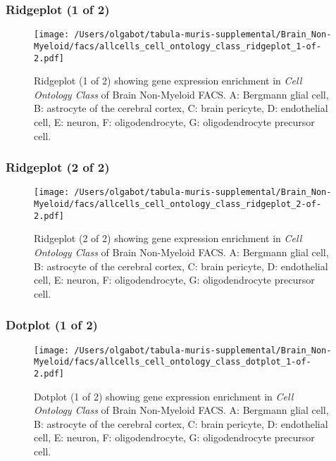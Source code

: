 \clearpage
\subsubsection{Ridgeplot (1 of 2)}
\begin{figure}[h]
\centering
\texttt{[image: /Users/olgabot/tabula-muris-supplemental/Brain\_Non-Myeloid/facs/allcells\_cell\_ontology\_class\_ridgeplot\_1-of-2.pdf]}

\caption{ Ridgeplot (1 of 2)  showing gene expression enrichment in \emph{Cell Ontology Class} of Brain Non-Myeloid FACS. A: Bergmann glial cell, B: astrocyte of the cerebral cortex, C: brain pericyte, D: endothelial cell, E: neuron, F: oligodendrocyte, G: oligodendrocyte precursor cell.}
\end{figure}


\clearpage
\subsubsection{Ridgeplot (2 of 2)}
\begin{figure}[h]
\centering
\texttt{[image: /Users/olgabot/tabula-muris-supplemental/Brain\_Non-Myeloid/facs/allcells\_cell\_ontology\_class\_ridgeplot\_2-of-2.pdf]}

\caption{ Ridgeplot (2 of 2)  showing gene expression enrichment in \emph{Cell Ontology Class} of Brain Non-Myeloid FACS. A: Bergmann glial cell, B: astrocyte of the cerebral cortex, C: brain pericyte, D: endothelial cell, E: neuron, F: oligodendrocyte, G: oligodendrocyte precursor cell.}
\end{figure}


\clearpage
\subsubsection{Dotplot (1 of 2)}
\begin{figure}[h]
\centering
\texttt{[image: /Users/olgabot/tabula-muris-supplemental/Brain\_Non-Myeloid/facs/allcells\_cell\_ontology\_class\_dotplot\_1-of-2.pdf]}

\caption{ Dotplot (1 of 2)  showing gene expression enrichment in \emph{Cell Ontology Class} of Brain Non-Myeloid FACS. A: Bergmann glial cell, B: astrocyte of the cerebral cortex, C: brain pericyte, D: endothelial cell, E: neuron, F: oligodendrocyte, G: oligodendrocyte precursor cell.}
\end{figure}


\clearpage
